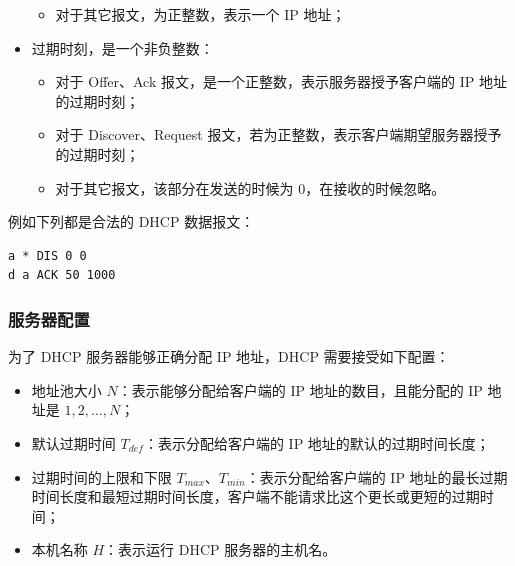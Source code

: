 \begin{itemize}
\begin{itemize}
              \item 对于其它报文，为正整数，表示一个 IP 地址；

          \end{itemize}



    \item 过期时刻，是一个非负整数：\begin{itemize}

              \item 对于 Offer、Ack 报文，是一个正整数，表示服务器授予客户端的 IP 地址的过期时刻；

              \item 对于 Discover、Request 报文，若为正整数，表示客户端期望服务器授予的过期时刻；

              \item 对于其它报文，该部分在发送的时候为 0，在接收的时候忽略。

          \end{itemize}



\end{itemize}

例如下列都是合法的 DHCP 数据报文：

\begin{lstlisting}
a * DIS 0 0
d a ACK 50 1000
\end{lstlisting}

\subsubsection*{服务器配置}

为了 DHCP 服务器能够正确分配 IP 地址，DHCP 需要接受如下配置：

\begin{itemize}

    \item 地址池大小 $N$：表示能够分配给客户端的 IP 地址的数目，且能分配的 IP 地址是 $1, 2, \dots, N$；

    \item 默认过期时间 $T_{def}$：表示分配给客户端的 IP 地址的默认的过期时间长度；

    \item 过期时间的上限和下限 $T_{max}$、$T_{min}$：表示分配给客户端的 IP 地址的最长过期时间长度和最短过期时间长度，客户端不能请求比这个更长或更短的过期时间；

    \item 本机名称 $H$：表示运行 DHCP 服务器的主机名。

\end{itemize}

